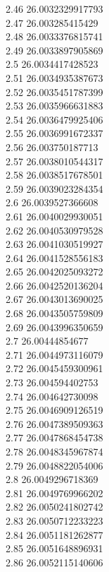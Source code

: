 {2.46	26.0032329917793\\
2.47	26.003285415429\\
2.48	26.0033376815741\\
2.49	26.0033897905869\\
2.5	26.0034417428523\\
2.51	26.0034935387673\\
2.52	26.0035451787399\\
2.53	26.0035966631883\\
2.54	26.0036479925406\\
2.55	26.0036991672337\\
2.56	26.003750187713\\
2.57	26.0038010544317\\
2.58	26.0038517678501\\
2.59	26.0039023284354\\
2.6	26.0039527366608\\
2.61	26.0040029930051\\
2.62	26.0040530979528\\
2.63	26.0041030519927\\
2.64	26.0041528556183\\
2.65	26.0042025093272\\
2.66	26.0042520136204\\
2.67	26.0043013690025\\
2.68	26.0043505759809\\
2.69	26.0043996350659\\
2.7	26.00444854677\\
2.71	26.0044973116079\\
2.72	26.0045459300961\\
2.73	26.004594402753\\
2.74	26.004642730098\\
2.75	26.0046909126519\\
2.76	26.0047389509363\\
2.77	26.0047868454738\\
2.78	26.0048345967874\\
2.79	26.0048822054006\\
2.8	26.0049296718369\\
2.81	26.0049769966202\\
2.82	26.0050241802742\\
2.83	26.0050712233223\\
2.84	26.0051181262877\\
2.85	26.0051648896931\\
2.86	26.0052115140606\\
}
